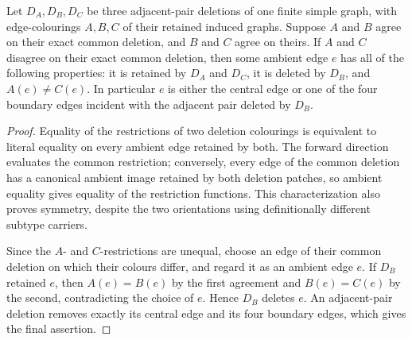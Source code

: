 \begin{lemma}
\label{lem:three-patch-common-core-localization}
Let $D_A,D_B,D_C$ be three adjacent-pair deletions of one finite simple
graph, with edge-colourings $A,B,C$ of their retained induced graphs.
Suppose $A$ and $B$ agree on their exact common deletion, and $B$ and
$C$ agree on theirs.  If $A$ and $C$ disagree on their exact common
deletion, then some ambient edge $e$ has all of the following properties:
it is retained by $D_A$ and $D_C$, it is deleted by $D_B$, and
$A(e)\ne C(e)$.  In particular $e$ is either the central edge or one of
the four boundary edges incident with the adjacent pair deleted by $D_B$.
\end{lemma}

\begin{proof}
Equality of the restrictions of two deletion colourings is equivalent to
literal equality on every ambient edge retained by both.  The forward
direction evaluates the common restriction; conversely, every edge of the
common deletion has a canonical ambient image retained by both deletion
patches, so ambient equality gives equality of the restriction functions.
This characterization also proves symmetry, despite the two orientations
using definitionally different subtype carriers.

Since the $A$- and $C$-restrictions are unequal, choose an edge of their
common deletion on which their colours differ, and regard it as an ambient
edge $e$.  If $D_B$ retained $e$, then $A(e)=B(e)$ by the first
agreement and $B(e)=C(e)$ by the second, contradicting the choice of
$e$.  Hence $D_B$ deletes $e$.  An adjacent-pair deletion removes
exactly its central edge and its four boundary edges, which gives the final
assertion.
\end{proof}

